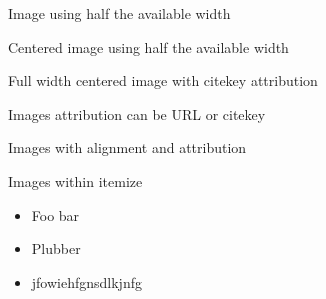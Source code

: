 \documentclass[11pt,compress,t,notes=noshow, xcolor=table]{beamer}
\begin{document}
\begin{frame}{Image using half the available width}
\end{frame}

\begin{frame}{Centered image using half the available width}
\end{frame}



\begin{frame}{Full width centered image with citekey attribution}
\end{frame}


\begin{frame}[c]{Images attribution can be URL or citekey}
  
  
\end{frame}

\begin{frame}{Images with alignment and attribution}
  
  
\end{frame}




\begin{frame}{Images within itemize}
  
  \begin{itemize}
    \item Foo bar
    \item Plubber
    \item jfowiehfgnsdlkjnfg
  \end{itemize}
  
\end{frame}

\end{document}
